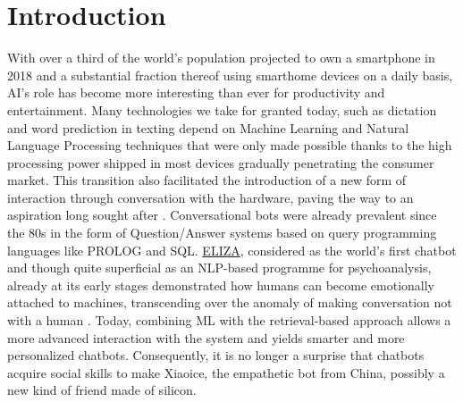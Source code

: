 \chapter{Introduction}
\label{introduction}
%

With over a third of the world's population projected to own a smartphone in 2018 \cite{statistasmartphones} and a substantial fraction thereof using smarthome devices on a daily basis, AI's role has become more interesting than ever for productivity and entertainment. Many technologies we take for granted today, such as dictation and word prediction in texting depend on Machine Learning and Natural Language Processing techniques that were only made possible thanks to the high processing power shipped in most devices gradually penetrating the consumer market. This transition also facilitated the introduction of a new form of interaction through conversation with the hardware, paving the way to an aspiration long sought after \cite{Starwars}. Conversational bots were already prevalent since the 80s in the form of Question/Answer systems based on query programming languages like PROLOG and SQL. \href{https://en.wikipedia.org/wiki/ELIZA}{ELIZA}, considered as the world's first chatbot and though quite superficial as an NLP-based programme for psychoanalysis, already at its early stages demonstrated how humans can become emotionally attached to machines, transcending over the anomaly of making conversation not with a human \cite{Weizenbaum1976}. Today, combining ML with the retrieval-based approach allows a more advanced interaction with the system and yields smarter and more personalized chatbots. Consequently, it is no longer a surprise that chatbots acquire social skills to make Xiaoice, the empathetic bot from China, possibly a new kind of friend made of silicon. \\

